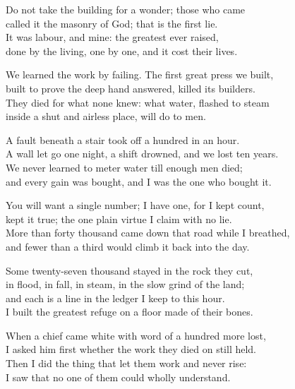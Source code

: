 \begin{founder}
\ornament

Do not take the building for a wonder; those who came\\
called it the masonry of God; that is the first lie.\\
It was labour, and mine: the greatest ever raised,\\
done by the living, one by one, and it cost their lives.\\
\medskip

We learned the work by failing. The first great press we built,\\
built to prove the deep hand answered, killed its builders.\\
They died for what none knew: what water, flashed to steam\\
inside a shut and airless place, will do to men.\\
\medskip

A fault beneath a stair took off a hundred in an hour.\\
A wall let go one night, a shift drowned, and we lost ten years.\\
We never learned to meter water till enough men died;\\
and every gain was bought, and I was the one who bought it.\\
\medskip

You will want a single number; I have one, for I kept count,\\
kept it true; the one plain virtue I claim with no lie.\\
More than forty thousand came down that road while I breathed,\\
and fewer than a third would climb it back into the day.\\
\medskip

Some twenty-seven thousand stayed in the rock they cut,\\
in flood, in fall, in steam, in the slow grind of the land;\\
and each is a line in the ledger I keep to this hour.\\
I built the greatest refuge on a floor made of their bones.\\
\medskip

When a chief came white with word of a hundred more lost,\\
I asked him first whether the work they died on still held.\\
Then I did the thing that let them work and never rise:\\
I saw that no one of them could wholly understand.\\
\medskip


\end{founder}
